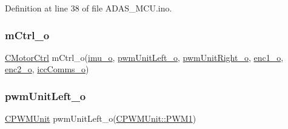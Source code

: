 Definition at line 38 of file A\+D\+A\+S\+\_\+\+M\+C\+U.\+ino.

\mbox{\label{_a_d_a_s___m_c_u_8ino_a60ac8587f0c0967b5e3056da59168874}} 
\subsubsection{\texorpdfstring{m\+Ctrl\+\_\+o}{mCtrl\_o}}
{\footnotesize\ttfamily \mbox{\hyperlink{class_c_motor_ctrl}{C\+Motor\+Ctrl}} m\+Ctrl\+\_\+o(\mbox{\hyperlink{_a_d_a_s___m_c_u_8ino_ae51e36f83228f859afeb8a72e60339a6}{imu\+\_\+o}}, \mbox{\hyperlink{_a_d_a_s___m_c_u_8ino_a10a570a59ef56c08699c4fec61d47d16}{pwm\+Unit\+Left\+\_\+o}}, \mbox{\hyperlink{_a_d_a_s___m_c_u_8ino_a49af1ef8724d9cb785e37641bb0cdc6b}{pwm\+Unit\+Right\+\_\+o}}, \mbox{\hyperlink{_a_d_a_s___m_c_u_8ino_ad90699f8fbb0fa8f734ae5c30885ee3b}{enc1\+\_\+o}}, \mbox{\hyperlink{_a_d_a_s___m_c_u_8ino_a54cfc96aae4913b87ab356a0665557a5}{enc2\+\_\+o}}, \mbox{\hyperlink{_a_d_a_s___m_c_u_8ino_a62ef6b3308259edb69af585549178324}{icc\+Comms\+\_\+o}})}

\mbox{\label{_a_d_a_s___m_c_u_8ino_a10a570a59ef56c08699c4fec61d47d16}} 
\subsubsection{\texorpdfstring{pwm\+Unit\+Left\+\_\+o}{pwmUnitLeft\_o}}
{\footnotesize\ttfamily \mbox{\hyperlink{class_c_p_w_m_unit}{C\+P\+W\+M\+Unit}} pwm\+Unit\+Left\+\_\+o(\mbox{\hyperlink{class_c_p_w_m_unit_ad3e55d1df0367d8a090d4b835704be44a3f6167a7882e80f1ad05c8bff5e538c0}{C\+P\+W\+M\+Unit\+::\+P\+W\+M1}})}

\mbox{\label{_a_d_a_s___m_c_u_8ino_a49af1ef8724d9cb785e37641bb0cdc6b}} 

